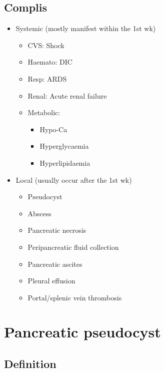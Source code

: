 \documentclass[
  14pt,
]{memoir}
\providecommand{\tightlist}{%
  \setlength{\itemsep}{0pt}\setlength{\parskip}{0pt}}
\begin{document}
\hypertarget{complis}{%
\subsection{Complis}\label{complis}}

\begin{itemize}
\tightlist
\item
  Systemic (mostly manifest within the 1st wk)

  \begin{itemize}
  \tightlist
  \item
    CVS: Shock
  \item
    Haemato: DIC
  \item
    Resp: ARDS
  \item
    Renal: Acute renal failure
  \item
    Metabolic:

    \begin{itemize}
    \tightlist
    \item
      Hypo-Ca
    \item
      Hyperglycaemia
    \item
      Hyperlipidaemia
    \end{itemize}
  \end{itemize}
\item
  Local (usually occur after the 1st wk)

  \begin{itemize}
  \tightlist
  \item
    Pseudocyst
  \item
    Abscess
  \item
    Pancreatic necrosis
  \item
    Peripancreatic fluid collection
  \item
    Pancreatic ascites
  \item
    Pleural effusion
  \item
    Portal/splenic vein thrombosis
  \end{itemize}
\end{itemize}

\pagebreak

\hypertarget{pancreatic-pseudocyst}{%
\section{Pancreatic pseudocyst}\label{pancreatic-pseudocyst}}

\hypertarget{definition-1}{%
\subsection{Definition}\label{definition-1}}
\end{document}
